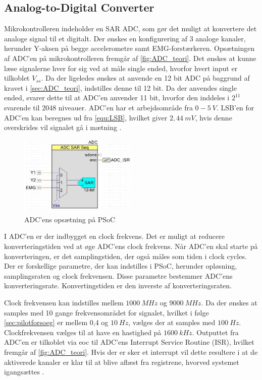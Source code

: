 \subsection{Analog-to-Digital Converter}
Mikrokontrolleren indeholder en SAR ADC, som gør det muligt at konvertere det analoge signal til et digitalt. Der ønskes en konfigurering af 3 analoge kanaler, herunder Y-aksen på begge accelerometre samt EMG-forstærkeren. Opsætningen af ADC'en på mikrokontrolleren fremgår af \autoref{fig:ADC_teori}. Det ønskes at kunne læse signalerne hver for sig ved at måle single ended, hvorfor hvert input er tilkoblet $V_{ss}$. Da der ligeledes ønskes at anvende en 12 bit ADC på baggrund af kravet i \autoref{sec:ADC_teori}, indstilles denne til 12 bit. Da der anvendes single ended, svarer dette til at ADC'en anvender 11 bit, hvorfor den inddeles i $2^{11}$ svarende til 2048 niveauer. ADC'en har et arbejdsområde fra $0-5~V$. LSB'en for ADC'en kan beregnes ud fra \autoref{equ:LSB}, hvilket giver $2,44~mV$, hvis denne overskrides vil signalet gå i mætning \citep{ADC2014}. 


\begin{figure}[H]
\centering
\includegraphics[width=0.5\textwidth]{figures/implementering/ADC_imp.jpg}
\caption{ADC'ens opsætning på PSoC}
\label{fig:ADC_teori}
\end{figure}

\noindent
I ADC'en er der indbygget en clock frekvens. Det er muligt at reducere konverteringstiden ved at øge ADC'ens clock frekvens. Når ADC'en skal starte på konverteringen, er det samplingstiden, der også måles som tiden i clock cycles. Der er forskellige parametre, der kan indstilles i PSoC, herunder opløsning, samplingsraten og clock frekvensen. Disse parametre bestemmer ADC'ens konverteringsrate. Konvertingstiden er den inverste af konverteringsraten. 

Clock frekvensen kan indstilles mellem $1000~MHz$ og $9000~MHz$.\citep{ADC2014} Da der ønskes at samples med 10 gange frekvensområdet for signalet, hvilket i følge  \autoref{sec:pilotforsoeg} er mellem 0,4 og $10~Hz$, vælges der at samples med $100~Hz$. Clockfrekvensen vælges til at have en hastighed på $1600~kHz$. Outputtet fra ADC'en er tilkoblet via eoc til ADC'ens Interrupt Service Routine (ISR), hvilket fremgår af \autoref{fig:ADC_teori}. Hvis der er sker et interrupt vil dette resultere i at de aktiverede kanaler er klar til at blive aflæst fra registrene, hvorved systemet igangsættes \citep{ADC2014}.



